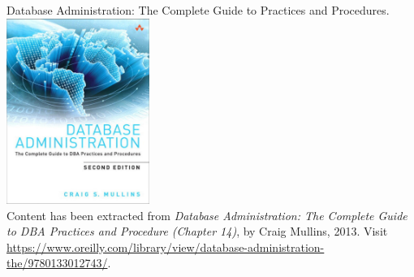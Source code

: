 \documentclass{beamer}
\begin{document}
\begin{frame}{Database Administration: The Complete Guide to Practices and Procedures.}
    \centering
    \includegraphics[width=0.35\textwidth]{figures/book_cover}\\
    \vspace{2mm}
    {
        \scriptsize
        Content has been extracted from \textit{Database Administration: The Complete Guide to DBA Practices and Procedure (Chapter 14)}, by Craig Mullins, 2013.  Visit \url{https://www.oreilly.com/library/view/database-administration-the/9780133012743/}.
    }
\end{frame}
\end{document}
